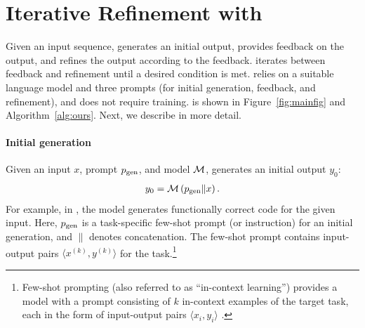    
\section{Iterative Refinement with \ours}
\label{sec:method}
Given an input sequence, \ours 
generates an initial output, provides feedback on the output, and refines the 
output according to the feedback. \ours iterates between feedback and refinement until a desired condition is met.
\ours relies on a suitable language model and three prompts (for initial generation, feedback, and refinement), and does not require training.
\ours is shown in Figure~\ref{fig:mainfig} and Algorithm~\ref{alg:ours}.
Next, we describe \ours in more detail.


\paragraph{Initial generation}
Given an input $x$, prompt $p_{\text{gen}}$, and model $\mathcal{M}$, \ours generates an initial output $y_0$:
\begin{align}
     y_0 = \mathcal{M}\left(p_{\text{gen}} \| x\right).
    \label{eq:gen}
\end{align}
For example, in , the model generates functionally correct code for the given input. 
Here, $p_{\text{gen}}$ is a task-specific few-shot prompt 
(or instruction) 
for an initial generation, and $\|$ denotes concatenation.
The few-shot prompt contains input-output pairs $\langle x^{(k)}, y^{(k)} \rangle$ for the task.\footnote{Few-shot prompting (also referred to as ``in-context learning'') provides a model with a prompt consisting of $k$ in-context examples of the target task, each in the form of input-output pairs $\langle x_i, y_i\rangle$ \citep{brown2020language}.}


